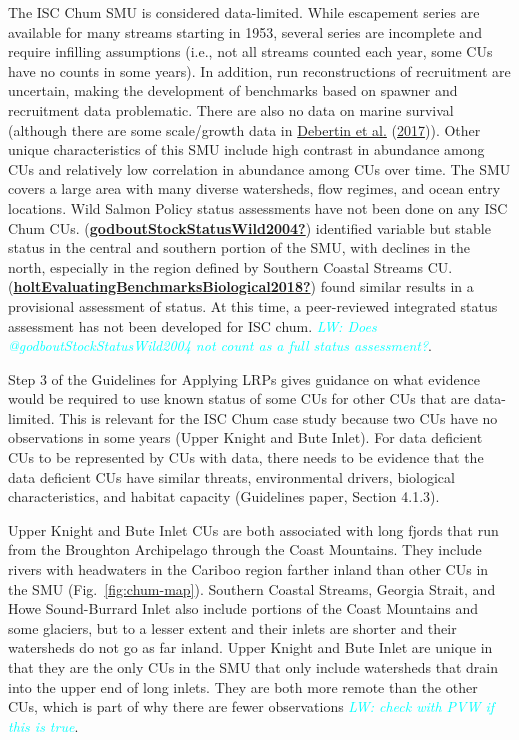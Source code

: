 \documentclass[11pt]{book}
\begin{document}
The ISC Chum SMU is considered data-limited. While escapement series are available for many streams starting in 1953, several series are incomplete and require infilling assumptions (i.e., not all streams counted each year, some CUs have no counts in some years). In addition, run reconstructions of recruitment are uncertain, making the development of benchmarks based on spawner and recruitment data problematic. There are also no data on marine survival (although there are some scale/growth data in \protect\hyperlink{ref-debertinMarineGrowthPatterns2017}{Debertin et al.} (\protect\hyperlink{ref-debertinMarineGrowthPatterns2017}{2017})). Other unique characteristics of this SMU include high contrast in abundance among CUs and relatively low correlation in abundance among CUs over time. The SMU covers a large area with many diverse watersheds, flow regimes, and ocean entry locations. Wild Salmon Policy status assessments have not been done on any ISC Chum CUs. (\protect\hyperlink{ref-godboutStockStatusWild2004}{\textbf{godboutStockStatusWild2004?}}) identified variable but stable status in the central and southern portion of the SMU, with declines in the north, especially in the region defined by Southern Coastal Streams CU. (\protect\hyperlink{ref-holtEvaluatingBenchmarksBiological2018}{\textbf{holtEvaluatingBenchmarksBiological2018?}}) found similar results in a provisional assessment of status. At this time, a peer-reviewed integrated status assessment has not been developed for ISC chum. \emph{\textcolor{cyan}{LW: Does @godboutStockStatusWild2004 not count as a full status assessment?}}.

Step 3 of the Guidelines for Applying LRPs gives guidance on what evidence would be required to use known status of some CUs for other CUs that are data-limited. This is relevant for the ISC Chum case study because two CUs have no observations in some years (Upper Knight and Bute Inlet). For data deficient CUs to be represented by CUs with data, there needs to be evidence that the data deficient CUs have similar threats, environmental drivers, biological characteristics, and habitat capacity (Guidelines paper, Section 4.1.3).

Upper Knight and Bute Inlet CUs are both associated with long fjords that run from the Broughton Archipelago through the Coast Mountains. They include rivers with headwaters in the Cariboo region farther inland than other CUs in the SMU (Fig.~\ref{fig:chum-map}). Southern Coastal Streams, Georgia Strait, and Howe Sound-Burrard Inlet also include portions of the Coast Mountains and some glaciers, but to a lesser extent and their inlets are shorter and their watersheds do not go as far inland. Upper Knight and Bute Inlet are unique in that they are the only CUs in the SMU that only include watersheds that drain into the upper end of long inlets. They are both more remote than the other CUs, which is part of why there are fewer observations \emph{\textcolor{cyan}{LW: check with PVW if this is true}}.
\end{document}
